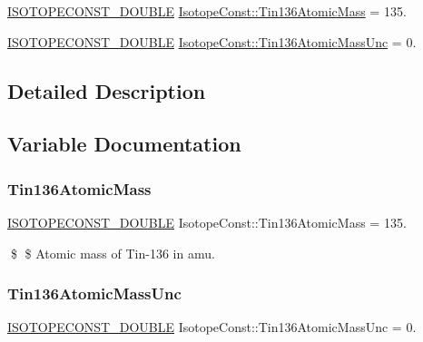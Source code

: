 \begin{DoxyCompactItemize}
\item 
\mbox{\hyperlink{group___isotope_const-_macros_ga8f45a7272ce02c0b4c65c44636ed719a}{I\+S\+O\+T\+O\+P\+E\+C\+O\+N\+S\+T\+\_\+\+D\+O\+U\+B\+LE}} \mbox{\hyperlink{group___isotope_const-_tin-_sn136_gaa3ff8b6666e533a4f599c967651a7773}{Isotope\+Const\+::\+Tin136\+Atomic\+Mass}} = 135.
\item 
\mbox{\hyperlink{group___isotope_const-_macros_ga8f45a7272ce02c0b4c65c44636ed719a}{I\+S\+O\+T\+O\+P\+E\+C\+O\+N\+S\+T\+\_\+\+D\+O\+U\+B\+LE}} \mbox{\hyperlink{group___isotope_const-_tin-_sn136_ga78d8238de18702b724d718a1b479471f}{Isotope\+Const\+::\+Tin136\+Atomic\+Mass\+Unc}} = 0.
\end{DoxyCompactItemize}


\subsection{Detailed Description}


\subsection{Variable Documentation}
\mbox{\label{group___isotope_const-_tin-_sn136_gaa3ff8b6666e533a4f599c967651a7773}} 
\subsubsection{\texorpdfstring{Tin136\+Atomic\+Mass}{Tin136AtomicMass}}
{\footnotesize\ttfamily \mbox{\hyperlink{group___isotope_const-_macros_ga8f45a7272ce02c0b4c65c44636ed719a}{I\+S\+O\+T\+O\+P\+E\+C\+O\+N\+S\+T\+\_\+\+D\+O\+U\+B\+LE}} Isotope\+Const\+::\+Tin136\+Atomic\+Mass = 135.}

\$ \$ Atomic mass of Tin-\/136 in amu. \mbox{\label{group___isotope_const-_tin-_sn136_ga78d8238de18702b724d718a1b479471f}} 
\subsubsection{\texorpdfstring{Tin136\+Atomic\+Mass\+Unc}{Tin136AtomicMassUnc}}
{\footnotesize\ttfamily \mbox{\hyperlink{group___isotope_const-_macros_ga8f45a7272ce02c0b4c65c44636ed719a}{I\+S\+O\+T\+O\+P\+E\+C\+O\+N\+S\+T\+\_\+\+D\+O\+U\+B\+LE}} Isotope\+Const\+::\+Tin136\+Atomic\+Mass\+Unc = 0.}

